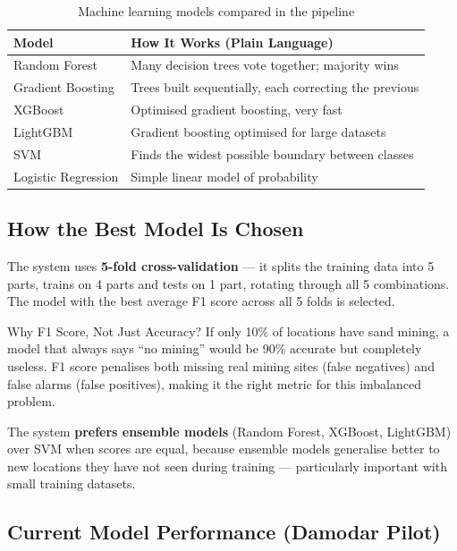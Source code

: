 \documentclass[12pt, a4paper]{article}
\begin{document}
\begin{table}[H]
\centering
\begin{tabular}{lp{8cm}}
\toprule
\textbf{Model} & \textbf{How It Works (Plain Language)} \\
\midrule
Random Forest & Many decision trees vote together; majority wins \\
Gradient Boosting & Trees built sequentially, each correcting the previous \\
XGBoost & Optimised gradient boosting, very fast \\
LightGBM & Gradient boosting optimised for large datasets \\
SVM & Finds the widest possible boundary between classes \\
Logistic Regression & Simple linear model of probability \\
\bottomrule
\end{tabular}
\caption{Machine learning models compared in the pipeline}
\end{table}

\subsection{How the Best Model Is Chosen}

The system uses \textbf{5-fold cross-validation} --- it splits the
training data into 5 parts, trains on 4 parts and tests on 1 part,
rotating through all 5 combinations. The model with the best average
F1 score across all 5 folds is selected.

\begin{keybox}{Why F1 Score, Not Just Accuracy?}
  If only 10\% of locations have sand mining, a model that always says
  ``no mining'' would be 90\% accurate but completely useless. F1 score
  penalises both missing real mining sites (false negatives) and false
  alarms (false positives), making it the right metric for this
  imbalanced problem.
\end{keybox}

The system \textbf{prefers ensemble models} (Random Forest, XGBoost,
LightGBM) over SVM when scores are equal, because ensemble models
generalise better to new locations they have not seen during training
--- particularly important with small training datasets.

\subsection{Current Model Performance (Damodar Pilot)}
\end{document}
